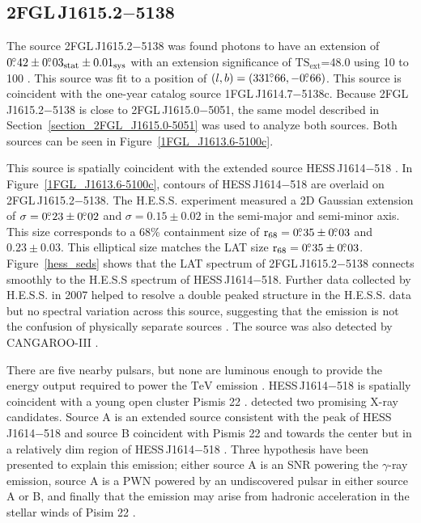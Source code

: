 \documentclass[12pt,preprint]{aastex}
\newcommand{\gev}{\text{GeV}\xspace}
\newcommand{\tev}{\text{TeV}\xspace}
\newcommand{\tsext}{{\ensuremath{\text{TS}_{\text{ext}}}}\xspace}
\newcommand{\suzaku}{\text{{\em Suzaku}}\xspace}
\newcommand{\rsixeight}{{\ensuremath{\text{r}_{68}}}\xspace}
\newcommand{\sys}{\text{sys}\xspace}
\newcommand{\stat}{\text{stat}\xspace}
\newcommand{\hl}[1]{#1}
\begin{document}
\subsection{2FGL\,J1615.2$-$5138}
\label{section_2FGL_J1615.2-5138}

The source 2FGL\,J1615.2$-$5138 was found 
photons to have an extension of $0\fdg42\pm0\fdg03_\stat\pm0.01_\sys$
with an extension significance of \tsext=48.0
using 10 \gev to 100 \gev.  This source was fit to a
position of $(l,b)=(331\mbox{$.\!\!^\circ$}66,-0\mbox{$.\!\!^\circ$}66)$.  This source is coincident
with the one-year catalog source 1FGL\,J1614.7$-$5138c.  Because 2FGL
J1615.2$-$5138 is close to 2FGL\,J1615.0$-$5051, the same model described
in Section~\ref{section_2FGL_J1615.0-5051} was used to analyze both
sources. Both sources can be seen in Figure~\ref{1FGL_J1613.6-5100c}.

This source is spatially coincident with the extended
\tev source HESS\,J1614$-$518 \citep{hess_plane_survey}. In
Figure~\ref{1FGL_J1613.6-5100c}, contours of HESS\,J1614$-$518 are overlaid
on 2FGL\,J1615.2$-$5138.  The H.E.S.S. experiment measured a 2D Gaussian
extension of $\sigma=0\mbox{$.\!\!^\circ$}23\pm0\mbox{$.\!\!^\circ$}02$ and $\sigma=0.15\pm0.02$
in the semi-major and semi-minor axis. This size corresponds
to a 68\% containment size of $\rsixeight=0\fdg35\pm0\fdg03$
and $0.23\pm0.03$.  This elliptical size matches the LAT size
$\rsixeight=0\fdg35\pm0\fdg03$.  Figure~\ref{hess_seds} shows
that the LAT spectrum of 2FGL\,J1615.2$-$5138 connects smoothly to
the H.E.S.S spectrum of HESS\,J1614$-$518.  Further data collected by
H.E.S.S. in 2007 helped to resolve a double peaked structure in the
H.E.S.S. data but no spectral variation across this source, suggesting
that the emission is not the confusion of physically separate sources
\citep{closer_look_hess_j1614-518}.  The source was also detected by
CANGAROO-III \citep{cangaroo_j1614-518}.

\hl{
There are five nearby pulsars, but none are luminous enough to
provide the energy output required to power the $\tev$ 
emission \citep{closer_look_hess_j1614-518}.  HESS\,J1614$-$518
is spatially coincident with a young open cluster Pismis 22
\citep{hess_1614_landi_atel,closer_look_hess_j1614-518}.
\suzaku detected two
promising X-ray candidates. Source A is an extended source consistent
with the peak of HESS\,J1614$-$518 and source B coincident with Pismis 22
and towards the center but in a relatively dim region of HESS\,J1614$-$518
\citep{suazku_hess_j1614_518}.  Three hypothesis have been presented to
explain this emission; either source A is an SNR powering the $\gamma$-ray
emission, source A is a PWN powered by an undiscovered pulsar in either
source A or B, and finally that the emission may arise from hadronic 
acceleration in the stellar winds of Pisim 22 \citep{cangaroo_j1614-518}.
}
\end{document}
